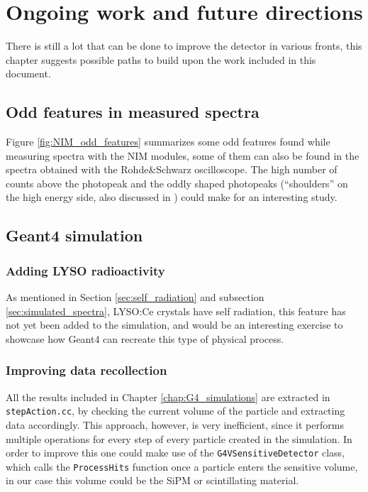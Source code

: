 \chapter{Ongoing work and future directions}\label{chap:future}

There is still a lot that can be done to improve the detector in various fronts, this chapter suggests possible paths to build upon the work included in this document.

\section{Odd features in measured spectra}

Figure \ref{fig:NIM_odd_features} summarizes some odd features found while measuring spectra with the NIM modules, some of them can also be found in the spectra obtained with the Rohde\&Schwarz oscilloscope. The high number of counts above the photopeak and the oddly shaped photopeaks (``shoulders'' on the high energy side, also discussed in \cite{peak_shoulders}) could make for an interesting study.

\section{Geant4 simulation}

\subsection{Adding LYSO radioactivity}

As mentioned in Section \ref{sec:self_radiation} and subsection \ref{sec:simulated_spectra}, LYSO:Ce crystals have self radiation, this feature has not yet been added to the simulation, and would be an interesting exercise to showcase how Geant4 can recreate this type of physical process.

\subsection{Improving data recollection}

All the results included in Chapter \ref{chap:G4_simulations} are extracted in \texttt{stepAction.cc}, by checking the current volume of the particle and extracting data accordingly. This approach, however, is very inefficient, since it performs multiple operations for every step of every particle created in the simulation. In order to improve this one could make use of the \texttt{G4VSensitiveDetector} class, which calls the \texttt{ProcessHits} function once a particle enters the sensitive volume, in our case this volume could be the SiPM or scintillating material.

